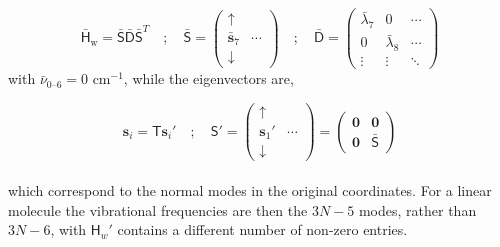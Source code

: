 \documentclass[10pt]{article}
\begin{document}
\begin{equation}
	\bar{\mathsf{H}}_\text{w} = \mathsf{\bar{S} \bar{D}\bar{S}}^T
	\quad ; \quad
	\bar{\mathsf{S}} =
	\begin{pmatrix}
		\uparrow & \\
		\bar{\boldsymbol{s}}_7 & \cdots \\
		\downarrow &
	\end{pmatrix}
	\quad ; \quad
	\bar{\mathsf{D}} =
	\begin{pmatrix}
		\bar{\lambda}_7 &  0& \cdots \\
		0 & \bar{\lambda}_8 & \cdots \\
		\vdots & \vdots & \ddots
	\end{pmatrix}
\end{equation}
with $\bar{\nu}_{0\text{--}6} = 0$ cm${}^{-1}$, while the eigenvectors are,

\begin{equation}
	\boldsymbol{s}_i = \mathsf{T}\boldsymbol{s}_i'
	\quad ; \quad
	\mathsf{S}' = \begin{pmatrix}
		\uparrow & \\
		\boldsymbol{s}_1' & \cdots\\
		\downarrow &
	\end{pmatrix}
    =
	\begin{pmatrix}
		\boldsymbol{0} & \boldsymbol{0} \\
		\boldsymbol{0} & \bar{\mathsf{S}}
	\end{pmatrix}
\end{equation}
\\
which correspond to the normal modes in the original coordinates. For a linear molecule the vibrational frequencies are then the $3N-5$ modes, rather than $3N-6$, with $\mathsf{H}_w'$ contains a different number of non-zero entries.
\end{document}
